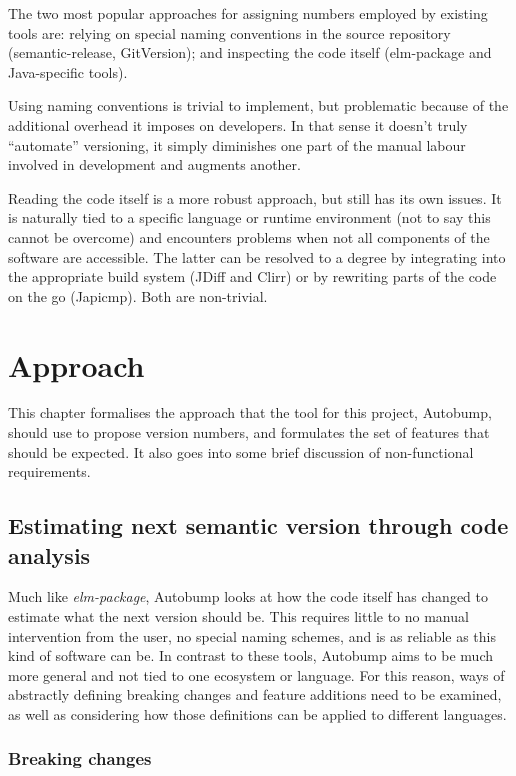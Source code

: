 \documentclass{l4proj}
\begin{document}
The two most popular approaches for assigning numbers employed by
existing tools are: relying on special naming conventions in the source
repository (semantic-release, GitVersion); and inspecting the code
itself (elm-package and Java-specific tools).

Using naming conventions is trivial to implement, but problematic
because of the additional overhead it imposes on developers. In that
sense it doesn't truly ``automate'' versioning, it simply diminishes one
part of the manual labour involved in development and augments another.

Reading the code itself is a more robust approach, but still has its
own issues. It is naturally tied to a specific language or runtime
environment (not to say this cannot be overcome) and encounters
problems when not all components of the software are accessible. The
latter can be resolved to a degree by integrating into the appropriate
build system (JDiff and Clirr) or by rewriting parts of the code on
the go (Japicmp). Both are non-trivial.

\chapter{Approach}
\label{Approach}

This chapter formalises the approach that the tool for this project,
Autobump, should use to propose version numbers, and formulates the
set of features that should be expected. It also goes into some brief
discussion of non-functional requirements.

\section{Estimating next semantic version
through code analysis}
\label{EstimatingNextSemver}

Much like \textit{elm-package}, Autobump looks at how the code itself
has changed to estimate what the next version should be. This requires
little to no manual intervention from the user, no special naming
schemes, and is as reliable as this kind of software can be. In
contrast to these tools, Autobump aims to be much more general and
not tied to one ecosystem or language. For this reason,
ways of abstractly defining breaking changes and feature additions
need to be examined, as well as considering how those definitions can
be applied to different languages.

\subsection{Breaking changes}
\label{BreakingChanges}
\end{document}

